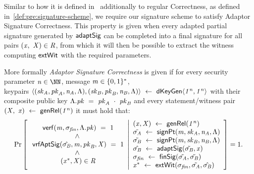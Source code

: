 Similar to how it is defined in~\cite{aumayr2020bitcoinchannels} additionally to regular Correctness, as defined in~\cref{def:pre:signature-scheme}, we require our signature scheme to satisfy Adaptor Signature Correctness.
This property is given when every adapted partial signature generated by $\mathsf{adaptSig}$ can be completed into a final signature for all pairs $(\mathit{x} ,~ \mathit{X}) \in \mathit{R}$, from which it will then be possible to extract the witness computing $\mathsf{extWit}$ with the required parameters.

\begin{definition}
    \label{def:sig:apt-sig-correctness}
    More formally \emph{Adaptor Signature Correctness} is given if for every security parameter $\varN \in \cnstNatural$, message $\mathit{m} \in \{0,1\}^{*}$, \\ keypairs $\langle (\mathit{sk}_{\mathit{A}}, \mathit{pk}_{\mathit{A}}, \mathit{\mathit{n}_{\mathit{A}}}, \Lambda), (\mathit{sk}_{\mathit{B}}, \mathit{pk}_{\mathit{B}}, \mathit{\mathit{n}_{\mathit{B}}}, \Lambda) \rangle ~\leftarrow~ \mathsf{dKeyGen}\langle \mathit{1^n}, \mathit{1^n} \rangle$ with their composite public key $\Lambda.\mathit{pk} ~=~ \mathit{pk}_{\mathit{A}} ~\cdot~ \mathit{pk}_{\mathit{B}}$ and every statement/witness pair $(\mathit{X} ,~ \mathit{x}) ~\leftarrow~ \mathsf{genRel}(\mathit{1^n})$ it must hold that:
    \[
        \Pr\left[
        \begin{array}{c}
            \:\mathsf{verf}(\mathit{m}, \sigma_{\mathit{fin}}, \Lambda.\mathit{pk}) ~=~ 1                                         \\
            ~\land~                                                                                              \\
            \: \mathsf{vrfAptSig}(\hat{\sigma_{\mathit{B}}},\mathit{m},\mathit{pk}_{\mathit{B}},\mathit{X}) ~=~ 1             \\
            ~\land~                                                                                              \\
            \:(\mathit{x}^*, \mathit{X}) \in \mathit{R}
        \end{array}
        \middle\vert
        \begin{array}{l}
            (\mathit{x}, \mathit{X}) ~\leftarrow~ \mathsf{genRel}(\mathit{1^n}) \\
            \tilde{\sigma_{\mathit{A}}} ~\leftarrow~ \mathsf{signPt}(\mathit{m}, \mathit{sk}_{\mathit{A}}, \mathit{\mathit{n}_{\mathit{A}}}, \Lambda)        \\
            \tilde{\sigma_{\mathit{B}}} ~\leftarrow~ \mathsf{signPt}(\mathit{m}, \mathit{sk}_{\mathit{B}}, \mathit{\mathit{n}_{\mathit{B}}}, \Lambda)              \\
            \hat{\sigma_{\mathit{B}}} ~\leftarrow~ \mathsf{adaptSig}(\tilde{\sigma_{\mathit{B}}}, \mathit{x})                                             \\
            \sigma_{\mathit{fin}} ~\leftarrow~ \mathsf{finSig}(\tilde{\sigma_{\mathit{A}}}, \tilde{\sigma_{\mathit{B}}})                                           \\
            \mathit{x}^* ~\leftarrow~ \mathsf{extWit}(\sigma_{\mathit{fin}}, \tilde{\sigma_{\mathit{A}}}, \hat{\sigma_{\mathit{B}}})
        \end{array}
        \right]=1.
    \]
\end{definition}
